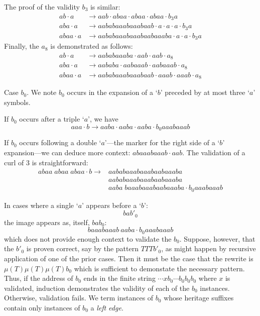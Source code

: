\documentclass[11pt]{article}
\def\emph#1{{\em #1\/}}
\def\term#1{\emph{#1}}
\def\ni{\noindent}
\def\q#1{`$#1$'}
\begin{document}
The proof
of the validity $b_3$ is similar:
\begin{align*}
ab\cdot a&\rightarrow aab\cdot abaa\cdot abaa\cdot abaa\cdot b_3a\\
aba\cdot a&\rightarrow aababaaabaaabaab\cdot a\cdot a\cdot a\cdot b_3a\\
abaa\cdot a&\rightarrow aababaaabaaabaabaaaba\cdot a\cdot a\cdot b_3a
\end{align*}
\ni Finally, the $a_8$ is demonstrated as follows:
\begin{align*}
ab\cdot a&\rightarrow aababaaaba\cdot aab\cdot aab\cdot a_8\\
aba\cdot a&\rightarrow aababa\cdot aabaaab\cdot aabaaab\cdot a_8\\
abaa\cdot a&\rightarrow aababaaabaaabaab\cdot aaab\cdot aaab\cdot a_8
\end{align*}

\ni Case $b_0$. We note $b_0$ occurs in the expansion of a \q{b} preceded
by at most three \q{a} symbols.

\ni If $b_0$ occurs after a triple \q{a}, we have 
$$aaa\cdot b\rightarrow aaba\cdot aaba\cdot aaba\cdot b_0aaabaaab$$

\ni If $b_0$ occurs following a double \q{a}---the marker for the right side
of a \q{b} expansion---we can deduce more context: $abaaabaaab\cdot aab$.
The validation of a curl of 3 is straightforward:
\begin{align*}
abaa\;abaa\;abaa\cdot b\rightarrow&aababaaabaaabaabaaaba\\
&aababaaabaaabaabaaaba\\
&aaba\;baaabaaabaabaaaba\cdot b_0aaabaaab
\end{align*}

\ni In cases where a single \q{a} appears before a \q{b}:
$$bab'_0$$
\ni the image appears as, itself, $bab_0$:
$$baaabaaab~aaba\cdot b_0aaabaaab$$
\ni which does not provide enough context to validate the $b_0$.  Suppose, however, that the $b'_0$ is
proven correct, say by the pattern $TTTb'_0$, as might happen by recursive application of one
of the prior cases.  Then it must be the case that the rewrite is $\mu(T)\mu(T)\mu(T)b_0$ which is sufficient
to demonstate the necessary pattern.  Thus, if the address of $b_0$ ends in the finite string $\cdots xb_0\cdots b_0b_0b_0$ where $x$ is validated, induction demonstrates the validity of each of the $b_0$ instances.  Otherwise,
validation fails.  We term instances of $b_0$ whose heritage suffixes contain only instances of $b_0$ a
\term{left edge}.
\end{document}
